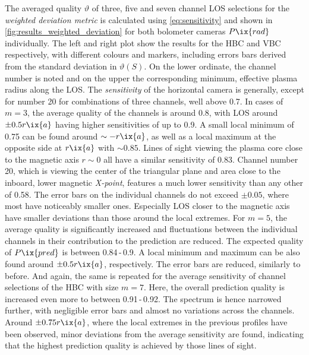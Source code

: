                 The averaged quality $\vartheta$ of three, five and seven channel LOS selections for the \textit{weighted deviation metric} is calculated using \cref{eq:sensitivity} and shown in \cref{fig:results_weighted_deviation} for both bolometer cameras $P\ix{rad}$ individually. The left and right plot show the results for the HBC and VBC respectively, with different colours and markers, including errors bars derived from the standard deviation in $\vartheta\left(S\right)$. On the lower ordinate, the channel number is noted and on the upper the corresponding minimum, effective plasma radius along the LOS. The \textit{sensitivity} of the horizontal camera is generally, except for number 20 for combinations of three channels, well above 0.7. In cases of $m=3$, the average quality of the channels is around 0.8, with LOS around $\pm0.5r\ix{a}$ having higher sensitivities of up to 0.9. A small local minimum of 0.75 can be found around $\sim -r\ix{a}$, as well as a local maximum at the opposite side at $r\ix{a}$ with $\sim 0.85$. Lines of sight viewing the plasma core close to the magnetic axis $r\sim0$ all have a similar sensitivity of 0.83. Channel number 20, which is viewing the center of the triangular plane and area close to the inboard, lower magnetic \textit{X-point}, features a much lower sensitivity than any other of 0.58. The error bars on the individual channels do not exceed $\pm0.05$, where most have noticeably smaller ones. Especially LOS closer to the magnetic axis have smaller deviations than those around the local extremes. For $m=5$, the average quality is significantly increased and fluctuations between the individual channels in their contribution to the prediction are reduced. The expected quality of $P\ix{pred}$ is between 0.84\,-\,0.9. A local minimum and maximum can be also found around $\pm0.5r\ix{a}$, respectively. The error bars are reduced, similarly to before. And again, the same is repeated for the average sensitivity of channel selections of the HBC with size $m=7$. Here, the overall prediction quality is increased even more to between 0.91\,-\,0.92. The spectrum is hence narrowed further, with negligible error bars and almost no variations across the channels. Around $\pm0.75r\ix{a}$, where the local extremes in the previous profiles have been observed, minor deviations from the average sensitivity are found, indicating that the highest prediction quality is achieved by those lines of sight.\\%
%

